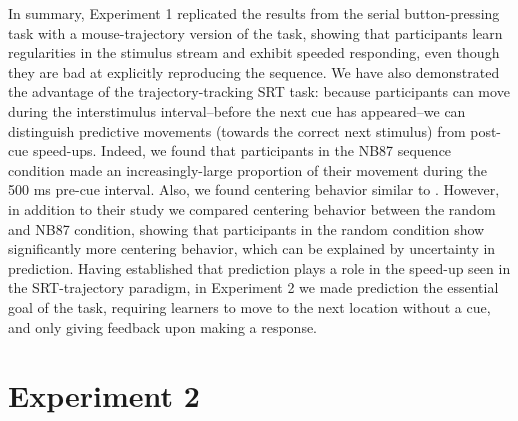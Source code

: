 \documentclass[man,floatsintext]{apa6}
\begin{document}
In summary, Experiment 1 replicated the results from the  serial button-pressing task with a mouse-trajectory version of the task, showing that participants learn regularities in the stimulus stream and exhibit speeded responding, even though they are bad at explicitly reproducing the sequence. We have also demonstrated the advantage of the trajectory-tracking SRT task: because participants can move during the interstimulus interval--before the next cue has appeared--we can distinguish predictive movements (towards the correct next stimulus) from post-cue speed-ups. Indeed, we found that participants in the NB87 sequence condition made an increasingly-large proportion of their movement during the 500 ms pre-cue interval. Also, we found centering behavior similar to . However, in addition to their study we compared centering behavior between the random and NB87 condition, showing that participants in the random condition show significantly more centering behavior, which can be explained by uncertainty in prediction. Having established that prediction plays a role in the speed-up seen in the SRT-trajectory paradigm, in Experiment 2 we made prediction the essential goal of the task, requiring learners to move to the next location without a cue, and only giving feedback upon making a response.

\section{Experiment 2}
\end{document}
